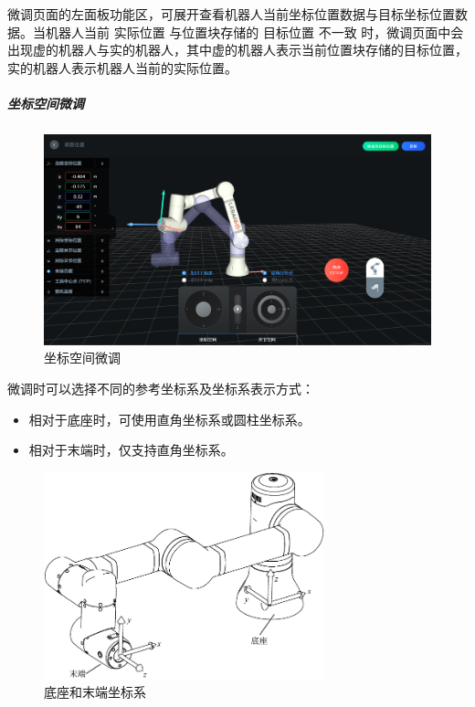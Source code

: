微调页面的左面板功能区，可展开查看机器人当前坐标位置数据与目标坐标位置数据。当机器人当前 实际位置 与位置块存储的 目标位置 不一致 时，微调页面中会出现虚的机器人与实的机器人，其中虚的机器人表示当前位置块存储的目标位置，实的机器人表示机器人当前的实际位置。

\subparagraph{坐标空间微调}

\begin{figure}[ht]
	\centering
	\includegraphics[width=\textwidth]{image/07/图3.8 坐标空间微调.png}
	\caption{坐标空间微调}
	\label{fig:坐标空间微调}
\end{figure}

微调时可以选择不同的参考坐标系及坐标系表示方式： 
\begin{itemize}
	\item 相对于底座时，可使用直角坐标系或圆柱坐标系。
	\item 相对于末端时，仅支持直角坐标系。
\end{itemize}

\begin{figure}[ht]
	\centering
	\includegraphics[height=6cm]{line_graphs/fine_tuning_coordinate.pdf}
	\caption{底座和末端坐标系}
	\label{fig:坐标空间示意图}
\end{figure}


